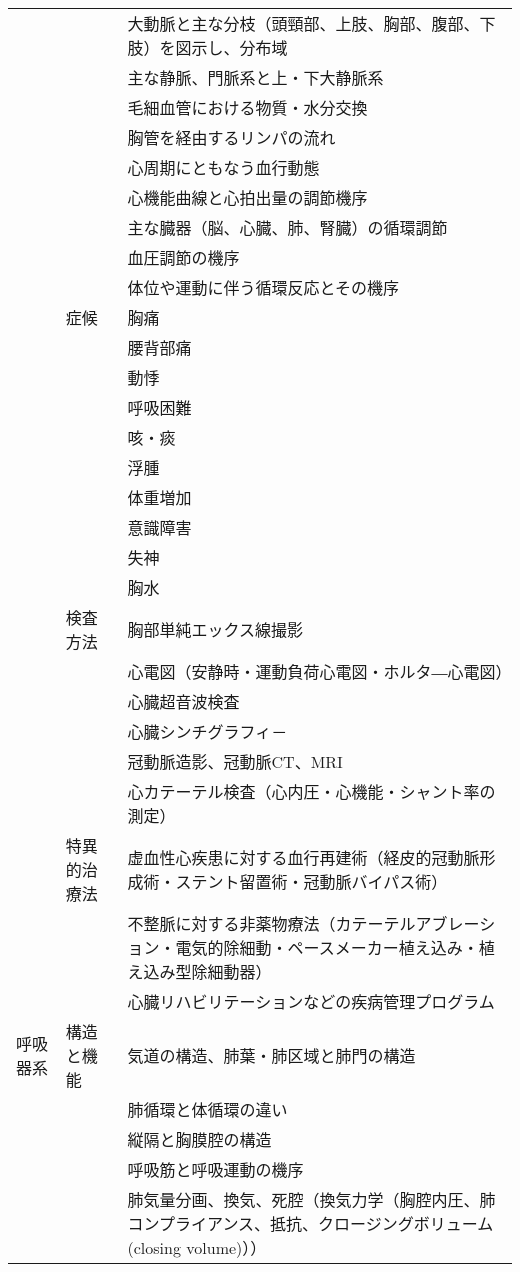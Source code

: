 \begin{xltabular}{\linewidth}{XXX}
 &  & 大動脈と主な分枝（頭頸部、上肢、胸部、腹部、下肢）を図示し、分布域 \\
 &  & 主な静脈、門脈系と上・下大静脈系 \\
 &  & 毛細血管における物質・水分交換 \\
 &  & 胸管を経由するリンパの流れ \\
 &  & 心周期にともなう血行動態 \\
 &  & 心機能曲線と心拍出量の調節機序 \\
 &  & 主な臓器（脳、心臓、肺、腎臓）の循環調節 \\
 &  & 血圧調節の機序 \\
 &  & 体位や運動に伴う循環反応とその機序 \\
 & 症候 & 胸痛 \\
 &  & 腰背部痛 \\
 &  & 動悸 \\
 &  & 呼吸困難 \\
 &  & 咳・痰 \\
 &  & 浮腫 \\
 &  & 体重増加 \\
 &  & 意識障害 \\
 &  & 失神 \\
 &  & 胸水 \\
 & 検査方法 & 胸部単純エックス線撮影 \\
 &  & 心電図（安静時・運動負荷心電図・ホルタ―心電図） \\
 &  & 心臓超音波検査 \\
 &  & 心臓シンチグラフィ－ \\
 &  & 冠動脈造影、冠動脈CT、MRI \\
 &  & 心カテーテル検査（心内圧・心機能・シャント率の測定） \\
 & 特異的治療法 & 虚血性心疾患に対する血行再建術（経皮的冠動脈形成術・ステント留置術・冠動脈バイパス術） \\
 &  & 不整脈に対する非薬物療法（カテーテルアブレーション・電気的除細動・ペースメーカー植え込み・植え込み型除細動器） \\
 &  & 心臓リハビリテーションなどの疾病管理プログラム \\
呼吸器系 & 構造と機能 & 気道の構造、肺葉・肺区域と肺門の構造 \\
 &  & 肺循環と体循環の違い \\
 &  & 縦隔と胸膜腔の構造 \\
 &  & 呼吸筋と呼吸運動の機序 \\
 &  & 肺気量分画、換気、死腔（換気力学（胸腔内圧、肺コンプライアンス、抵抗、クロージングボリューム(closing volume)）） \\

\end{xltabular}
